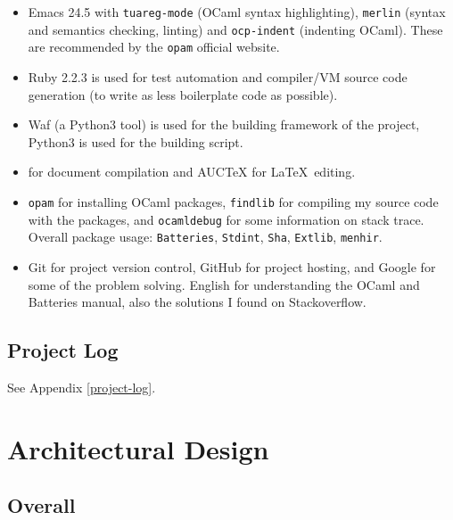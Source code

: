 \documentclass{report}
\begin{document}
\begin{itemize}
\item Emacs 24.5 with \texttt{tuareg-mode} (OCaml syntax
  highlighting), \texttt{merlin} (syntax and semantics checking,
  linting) and \texttt{ocp-indent} (indenting OCaml). These are
  recommended by the \texttt{opam} official website.

\item Ruby 2.2.3 is used for test automation and compiler/VM source code
  generation (to write as less boilerplate code as possible).

\item Waf (a Python3 tool) is used for the building framework of the
  project, Python3 is used for the building script.

\item \XeTeX{} for document compilation and AUCTeX for \LaTeX ~editing.

\item \texttt{opam} for installing OCaml packages, \texttt{findlib} for compiling my source code with the packages, and \texttt{ocamldebug} for some information on stack trace. Overall package usage: \texttt{Batteries}, \texttt{Stdint}, \texttt{Sha}, \texttt{Extlib}, \texttt{menhir}.

\item Git for project version control, GitHub for project hosting, and Google for some of the problem solving. English for understanding the OCaml and Batteries manual, also the solutions I found on Stackoverflow.
\end{itemize}

\section{Project Log}

See Appendix \autoref{project-log}.

\chapter{Architectural Design}

\section{Overall}
\end{document}
